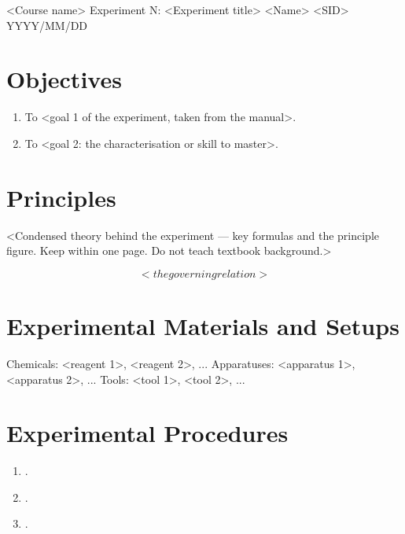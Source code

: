 \documentclass[12pt]{sustech-labreport}
\begin{document}
\makesutitle
  {<Course name>}
  {Experiment N: <Experiment title>}
  {<Name>}
  {<SID>}
  {YYYY/MM/DD}
  {}
  {}


\section{Objectives}
\begin{enumerate}
  \item To <goal 1 of the experiment, taken from the manual>.
  \item To <goal 2: the characterisation or skill to master>.
\end{enumerate}

\section{Principles}
<Condensed theory behind the experiment — key formulas and the principle
figure. Keep within one page. Do not teach textbook background.>

\begin{equation}\label{eq:main}
<the governing relation>
\end{equation}

\section{Experimental Materials and Setups}
Chemicals: <reagent 1>, <reagent 2>, ...
Apparatuses: <apparatus 1>, <apparatus 2>, ...
Tools: <tool 1>, <tool 2>, ...


\section{Experimental Procedures}
\begin{enumerate}
  \item <Step 1 of the in-class operation>.
  \item <Step 2>.
  \item <Step 3>.
\end{enumerate}
\end{document}
